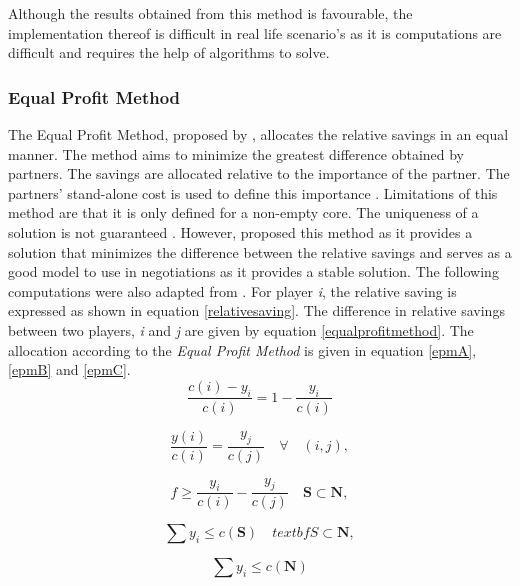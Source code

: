 Although the results obtained from this method is favourable, the implementation thereof is difficult in real life scenario's as it is computations are difficult and requires the help of algorithms to solve.

\subsubsection{Equal Profit Method}
The Equal Profit Method, proposed by \citet{frisk2010cost}, allocates the relative savings in an equal manner. The method aims to minimize the greatest difference obtained by partners. The savings are allocated relative to the importance of the partner. The partners' stand-alone cost is used to define this importance \citep{defryn2013gain}. Limitations of this method are that it is only defined for a non-empty core. The uniqueness of a solution is not guaranteed \citep{wiese2010applied}. However, \citet{frisk2010cost} proposed this method as it provides a solution that minimizes the difference between the relative savings and serves as a good model to use in negotiations as it provides a stable solution. The following computations were also adapted from \citet{wiese2010applied}.
For player \textit{i}, the relative saving is expressed as shown in equation \ref{relativesaving}. The difference in relative savings between two players, \textit{i} and \textit{j} are given by equation \ref{equalprofitmethod}. The allocation according to the \textit{Equal Profit Method} is given in equation \ref{epmA}, \ref{epmB} and \ref{epmC}.
\begin{equation}
\label{relativesaving}
\frac{c({i}) - y_i}{c({i})} = 1 - \frac{y_i}{c({i})}
\end{equation}

\begin{equation}
\label{equalprofitmethod}
\frac{y({i})}{c({i})} = \frac{y_j}{c({j})} \quad \forall \quad  (i,j),
\end{equation}

\begin{equation}
\label{epmA}
\textit{f} \geq \frac{y_i}{c({i})} - \frac{y_j}{c({j})} \quad  \textbf{S} \subset \textbf{N}, 
\end{equation}

\begin{equation}
\label{epmB}
\sum y_i \leq c(\textbf{S}) \quad textbf{S}  \subset \textbf{N},
\end{equation}

\begin{equation}
\label{epmC}
\sum y_i \leq c(\textbf{N})
\end{equation}


